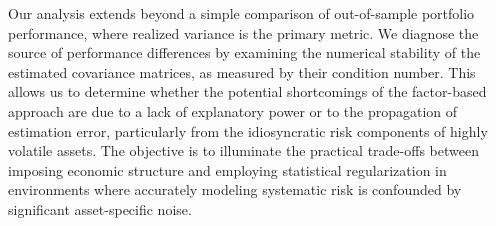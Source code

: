 \documentclass[]{article}
\begin{document}
Our analysis extends beyond a simple comparison of out-of-sample portfolio performance, where realized variance is the primary metric. We diagnose the source of performance differences by examining the numerical stability of the estimated covariance matrices, as measured by their condition number. This allows us to determine whether the potential shortcomings of the factor-based approach are due to a lack of explanatory power or to the propagation of estimation error, particularly from the idiosyncratic risk components of highly volatile assets. The objective is to illuminate the practical trade-offs between imposing economic structure and employing statistical regularization in environments where accurately modeling systematic risk is confounded by significant asset-specific noise.
\end{document}
